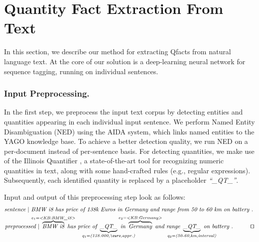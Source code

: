 \section{Quantity Fact Extraction From Text}
\label{sec:extract}
In this section, we describe our method for extracting Qfacts from natural language text.
At the core of our solution is a deep-learning neural network for sequence tagging, running on individual sentences. 

\subsubsection{Input Preprocessing.} In the first step, we preprocess the input text corpus by detecting entities and quantities appearing in each individual input sentence.  
We perform Named Entity Disambiguation (NED) 
using the AIDA \cite{DBLP:conf/emnlp/HoffartYBFPSTTW11} system,
which links named entities to the YAGO knowledge base\cite{DBLP:conf/www/SuchanekKW07}. To achieve a better detection quality, we run NED on a per-document instead of per-sentence basis.
For detecting quantities, we make use of the Illinois Quantifier \cite{DBLP:journals/tacl/RoyVR15}, a state-of-the-art tool for 
recognizing numeric quantities in text, along with some hand-crafted rules (e.g., regular expressions). 
Subsequently, each identified quantity is replaced by a placeholder \textit{``\_QT\_''}. 
\begin{example}
\label{ex:3}
Input and output of this preprocessing step look as follows:
{\small
\begin{align*}
\textit{sentence} &\ |\ \textit{BMW i8 has price of 138k Euros in Germany and range from 50 to 60 km on battery .} \\
\textit{preproce}&\textit{ssed}\ |\ \overbrace{\textit{BMW i8}}^{\mathclap{e_1=\textit{<KB:BMW\_i8>}}}\textit{ has price of }\underbrace{\textit{\_QT\_}}_{\mathclap{q_1=\textit{(138.000,\euro,appr.)}}}\textit{ in }\overbrace{\textit{Germany}}^{\mathclap{e_2=\textit{<KB:Germany>}}}\textit{ and range } \underbrace{\textit{\_QT\_}}_{\mathclap{q_2=\textit{(50-60,km,interval)}}}\textit{ on battery .}  \tag*{\qed}
\end{align*}
}
\end{example}
